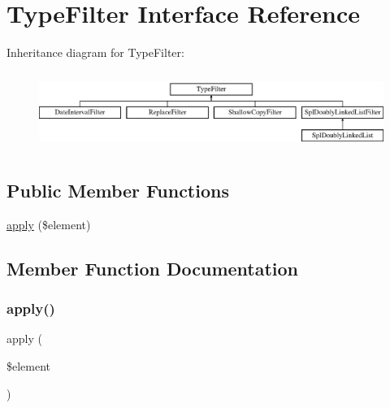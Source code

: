 \hypertarget{interface_deep_copy_1_1_type_filter_1_1_type_filter}{}\section{Type\+Filter Interface Reference}
\label{interface_deep_copy_1_1_type_filter_1_1_type_filter}
Inheritance diagram for Type\+Filter\+:\begin{figure}[H]
\begin{center}
\leavevmode
\includegraphics[height=2.576687cm]{interface_deep_copy_1_1_type_filter_1_1_type_filter}
\end{center}
\end{figure}
\subsection*{Public Member Functions}
\begin{DoxyCompactItemize}
\item 
\mbox{\hyperlink{interface_deep_copy_1_1_type_filter_1_1_type_filter_a959e75f8f2b305dcf33633745c338176}{apply}} (\$element)
\end{DoxyCompactItemize}


\subsection{Member Function Documentation}
\mbox{\label{interface_deep_copy_1_1_type_filter_1_1_type_filter_a959e75f8f2b305dcf33633745c338176}} 
\subsubsection{\texorpdfstring{apply()}{apply()}}
{\footnotesize\ttfamily apply (\begin{DoxyParamCaption}\item[{}]{\$element }\end{DoxyParamCaption})}

